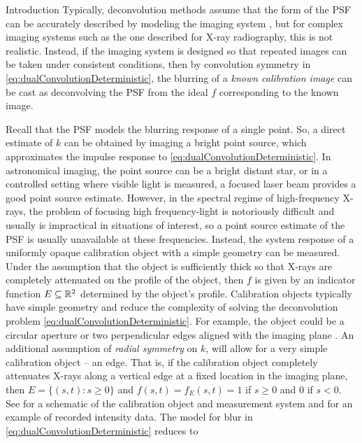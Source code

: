 \begin{chapter}{Introduction}
  Typically, deconvolution methods assume that the form of the PSF can be accurately described by modeling the imaging system \citep{jain1989,hansen2010}, but for complex imaging systems such as the one described for X-ray radiography, this is not realistic.
  Instead, if the imaging system is designed so that repeated images can be taken under consistent conditions, then by convolution symmetry in \eqref{eq:dualConvolutionDeterministic}, the blurring of a \emph{known calibration image} can be cast as deconvolving the PSF from the ideal $f$ corresponding to the known image.

  Recall that the PSF models the blurring response of a single point.
  So, a direct estimate of $k$ can be obtained by imaging a bright point source, which approximates the impulse response to \eqref{eq:dualConvolutionDeterministic}.
  In astronomical imaging, the point source can be a bright distant star, or in a controlled setting where visible light is measured, a focused laser beam provides a good point source estimate.
  However, in the spectral regime of high-frequency X-rays, the problem of focusing high frequency-light is notoriously difficult and usually is impractical in situations of interest, so a point source estimate of the PSF is usually unavailable at these frequencies.
  Instead, the system response of a uniformly opaque calibration object with a simple geometry can be measured.
  Under the assumption that the object is sufficiently thick so that X-rays are completely attenuated on the profile of the object, then $f$ is given by an indicator function $E \subseteq \mathbb R^2$ determined by the object's profile.
  Calibration objects typically have simple geometry and reduce the complexity of solving the deconvolution problem \eqref{eq:dualConvolutionDeterministic}.  
  For example, the object could be a circular aperture or two perpendicular edges aligned with the imaging plane \citep{doering1992,watson1993}.
  An additional assumption of \emph{radial symmetry} on $k$, will allow for a very simple calibration object -- an edge. 
  That is, if the calibration object completely attenuates X-rays along a vertical edge at a fixed location in the imaging plane, then $E=\{(s,t):s\ge0\}$ and $f(s,t) = f_E(s,t) = 1$ if $s\ge0$ and $0$ if $s <0$. 
  See  for a schematic of the calibration object and measurement system and  for an example of recorded intensity data.
  The model for blur in \eqref{eq:dualConvolutionDeterministic} reduces to
\begin{equation}\label{eq:psfForwardModelDeterministic2D}

\end{equation}
\end{chapter}
